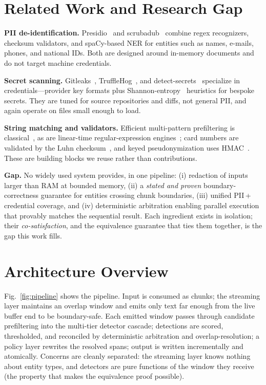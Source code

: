 \documentclass[conference]{IEEEtran}
\begin{document}
\section{Related Work and Research Gap}\label{sec:related}

\textbf{PII de-identification.} Presidio~\cite{presidio} and
scrubadub~\cite{scrubadub} combine regex recognizers, checksum validators, and
spaCy-based NER for entities such as names, e-mails, phones, and national IDs.
Both are designed around in-memory documents and do not target machine
credentials.

\textbf{Secret scanning.} Gitleaks~\cite{gitleaks}, TruffleHog~\cite{trufflehog},
and detect-secrets~\cite{detectsecrets} specialize in credentials---provider key
formats plus Shannon-entropy~\cite{shannon1948} heuristics for bespoke secrets.
They are tuned for source repositories and diffs, not general PII, and again
operate on files small enough to load.

\textbf{String matching and validators.} Efficient multi-pattern prefiltering is
classical~\cite{aho1975}, as are linear-time regular-expression
engines~\cite{thompson1968,re2cox2007}; card numbers are validated by the Luhn
checksum~\cite{luhn1960}, and keyed pseudonymization uses HMAC~\cite{hmac1996}.
These are building blocks we reuse rather than contributions.

\textbf{Gap.} No widely used system provides, in one pipeline: (i) redaction of
inputs larger than RAM at bounded memory, (ii) a \emph{stated and proven}
boundary-correctness guarantee for entities crossing chunk boundaries,
(iii) unified PII\,+\,credential coverage, and (iv) deterministic arbitration
enabling parallel execution that provably matches the sequential result. Each
ingredient exists in isolation; their \emph{co-satisfaction}, and the equivalence
guarantee that ties them together, is the gap this work fills.

\section{Architecture Overview}\label{sec:arch}

Fig.~\ref{fig:pipeline} shows the pipeline. Input is consumed as chunks; the
streaming layer maintains an overlap window and emits only text far enough from
the live buffer end to be boundary-safe. Each emitted window passes through
candidate prefiltering into the multi-tier detector cascade; detections are
scored, thresholded, and reconciled by deterministic arbitration and
overlap-resolution; a policy layer rewrites the resolved spans; output is written
incrementally and atomically. Concerns are cleanly separated: the streaming layer
knows nothing about entity types, and detectors are pure functions of the window
they receive (the property that makes the equivalence proof possible).
\end{document}
